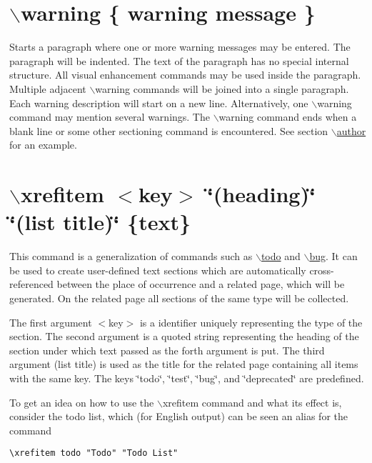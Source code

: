  \hypertarget{commands_cmdwarning}{}\section{$\backslash$warning \{ warning message \}}\label{commands_cmdwarning}
 Starts a paragraph where one or more warning messages may be entered. The paragraph will be indented. The text of the paragraph has no special internal structure. All visual enhancement commands may be used inside the paragraph. Multiple adjacent $\backslash$warning commands will be joined into a single paragraph. Each warning description will start on a new line. Alternatively, one $\backslash$warning command may mention several warnings. The $\backslash$warning command ends when a blank line or some other sectioning command is encountered. See section \hyperlink{commands_cmdauthor}{$\backslash$author} for an example.\hypertarget{commands_cmdxrefitem}{}\section{$\backslash$xrefitem $<$key$>$ \char`\"{}(heading)\char`\"{} \char`\"{}(list title)\char`\"{} \{text\}}\label{commands_cmdxrefitem}
 This command is a generalization of commands such as \hyperlink{commands_cmdtodo}{$\backslash$todo} and \hyperlink{commands_cmdbug}{$\backslash$bug}. It can be used to create user-defined text sections which are automatically cross-referenced between the place of occurrence and a related page, which will be generated. On the related page all sections of the same type will be collected.

The first argument $<$key$>$ is a identifier uniquely representing the type of the section. The second argument is a quoted string representing the heading of the section under which text passed as the forth argument is put. The third argument (list title) is used as the title for the related page containing all items with the same key. The keys \char`\"{}todo\char`\"{}, \char`\"{}test\char`\"{}, \char`\"{}bug\char`\"{}, and \char`\"{}deprecated\char`\"{} are predefined.

To get an idea on how to use the $\backslash$xrefitem command and what its effect is, consider the todo list, which (for English output) can be seen an alias for the command 

\footnotesize\begin{verbatim}\xrefitem todo "Todo" "Todo List" \end{verbatim}
\normalsize


